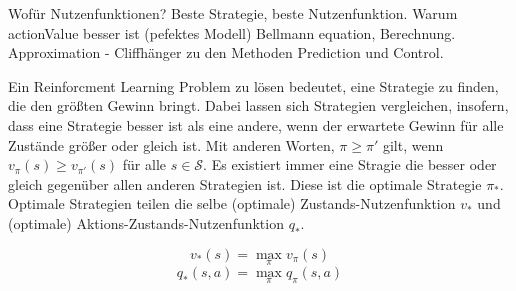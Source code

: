 Wofür Nutzenfunktionen?
Beste Strategie, beste Nutzenfunktion.
Warum actionValue besser ist (pefektes Modell)
Bellmann equation, Berechnung.
Approximation  - Cliffhänger zu den Methoden
Prediction und Control.


Ein Reinforcment Learning Problem zu lösen bedeutet, eine Strategie zu finden, die den größten Gewinn bringt. Dabei lassen sich Strategien vergleichen, insofern, dass eine Strategie besser ist als eine andere, wenn der erwartete Gewinn für alle Zustände größer oder gleich ist. Mit anderen Worten, $\pi \geq \pi'$ gilt, wenn $v_\pi(s) \geq v_{\pi'}(s)$ für alle $s \in \mathcal{S}$. Es existiert immer eine Stragie die besser oder gleich gegenüber allen anderen Strategien ist. Diese ist die optimale Strategie $\pi_*$. Optimale Strategien teilen die selbe (optimale) Zustands-Nutzenfunktion $v_*$ und (optimale) Aktions-Zustands-Nutzenfunktion $q_*$. 

\begin{equation}\label{eq:optimaleValueFunction}
    v_*(s) = \max_\pi v_\pi(s)
\end{equation}
\begin{equation}\label{eq:optimaleActionValueFunction}
    q_*(s,a) = \max_\pi q_\pi(s,a)
\end{equation}


